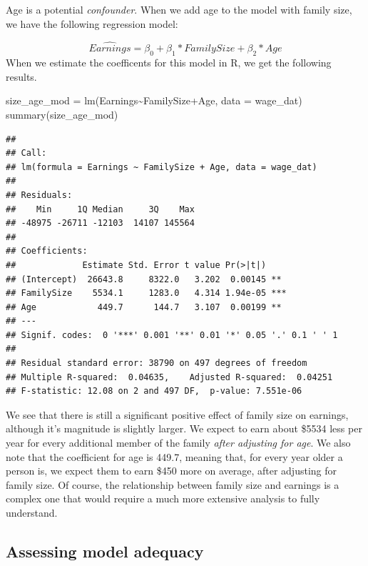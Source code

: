 \documentclass[
]{book}
\newenvironment{Shaded}{\begin{snugshade}}{\end{snugshade}}
\newcommand{\AttributeTok}[1]{\textcolor[rgb]{0.77,0.63,0.00}{#1}}
\newcommand{\FunctionTok}[1]{\textcolor[rgb]{0.00,0.00,0.00}{#1}}
\newcommand{\NormalTok}[1]{#1}
\newcommand{\OtherTok}[1]{\textcolor[rgb]{0.56,0.35,0.01}{#1}}
\newcommand{\SpecialCharTok}[1]{\textcolor[rgb]{0.00,0.00,0.00}{#1}}
\begin{document}
Age is a potential \emph{confounder}. When we add age to the model with family size, we have the following regression model:

\[\widehat{Earnings}=\beta_0+\beta_1*FamilySize+\beta_2*Age\]
When we estimate the coefficents for this model in R, we get the following results.

\begin{Shaded}
\begin{Highlighting}[]
\NormalTok{size\_age\_mod }\OtherTok{=} \FunctionTok{lm}\NormalTok{(Earnings}\SpecialCharTok{\textasciitilde{}}\NormalTok{FamilySize}\SpecialCharTok{+}\NormalTok{Age, }\AttributeTok{data =}\NormalTok{ wage\_dat)}
\FunctionTok{summary}\NormalTok{(size\_age\_mod)}
\end{Highlighting}
\end{Shaded}

\begin{verbatim}
## 
## Call:
## lm(formula = Earnings ~ FamilySize + Age, data = wage_dat)
## 
## Residuals:
##    Min     1Q Median     3Q    Max 
## -48975 -26711 -12103  14107 145564 
## 
## Coefficients:
##             Estimate Std. Error t value Pr(>|t|)    
## (Intercept)  26643.8     8322.0   3.202  0.00145 ** 
## FamilySize    5534.1     1283.0   4.314 1.94e-05 ***
## Age            449.7      144.7   3.107  0.00199 ** 
## ---
## Signif. codes:  0 '***' 0.001 '**' 0.01 '*' 0.05 '.' 0.1 ' ' 1
## 
## Residual standard error: 38790 on 497 degrees of freedom
## Multiple R-squared:  0.04635,    Adjusted R-squared:  0.04251 
## F-statistic: 12.08 on 2 and 497 DF,  p-value: 7.551e-06
\end{verbatim}

We see that there is still a significant positive effect of family size on earnings, although it's magnitude is slightly larger. We expect to earn about \$5534 less per year for every additional member of the family \emph{after adjusting for age}. We also note that the coefficient for age is 449.7, meaning that, for every year older a person is, we expect them to earn \$450 more on average, after adjusting for family size. Of course, the relationship between family size and earnings is a complex one that would require a much more extensive analysis to fully understand.

\hypertarget{assessing-model-adequacy-1}{%
\subsection{Assessing model adequacy}\label{assessing-model-adequacy-1}}
\end{document}
